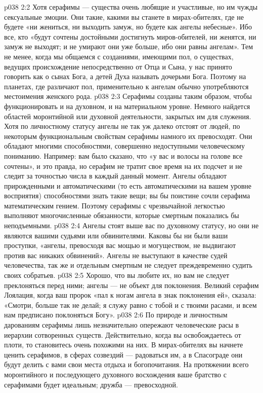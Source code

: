 \vs p038 2:2 \pc Хотя серафимы --- существа очень любящие и участливые, но им чужды сексуальные эмоции. Они такие, какими вы станете в мирах\hyp{}обителях, где не будете «ни жениться, ни выходить замуж, но будете как ангелы небесные». Ибо все, кто «будут сочтены достойными достигнуть миров\hyp{}обителей, ни женятся, ни замуж не выходят; и не умирают они уже больше, ибо они равны ангелам». Тем не менее, когда мы общаемся с созданиями, имеющими пол, о существах, ведущих происхождение непосредственно от Отца и Сына, у нас принято говорить как о сынах Бога, а детей Духа называть дочерьми Бога. Поэтому на планетах, где различают пол, применительно к ангелам обычно употребляются местоимения женского рода.
\vs p038 2:3 Серафимы созданы таким образом, чтобы функционировать и на духовном, и на материальном уровне. Немного найдется областей моронтийной или духовной деятельности, закрытых им для служения. Хотя по личностному статусу ангелы не так уж далеко отстоят от людей, по некоторым функциональным свойствам серафимы намного их превосходят. Они обладают многими способностями, совершенно недоступными человеческому пониманию. Например: вам было сказано, что «у вас и волосы на голове все сочтены», и это правда, но серафим не тратит свое время на их подсчет и не следит за точностью числа в каждый данный момент. Ангелы обладают прирожденными и автоматическими (то есть автоматическими на вашем уровне восприятия) способностями знать такие вещи; вы бы поистине сочли серафима математическим гением. Поэтому серафимы с чрезвычайной легкостью выполняют многочисленные обязанности, которые смертным показались бы неподъемными.
\vs p038 2:4 \pc Ангелы стоят выше вас по духовному статусу, но они не являются вашими судьями или обвинителями. Каковы бы ни были ваши проступки, «ангелы, превосходя вас мощью и могуществом, не выдвигают против вас никаких обвинений». Ангелы не выступают в качестве судей человечества, так же и отдельным смертным не следует преждевременно судить своих собратьев.
\vs p038 2:5 \pc Хорошо, что вы любите их, но вам не следует преклоняться перед ними; ангелы --- не объект для поклонения. Великий серафим Лоялация, когда ваш пророк «пал к ногам ангела в знак поклонения ей», сказала: «Смотри, больше так не делай; я служу равно с тобой и с твоими расами, и всем нам предписано поклоняться Богу».
\vs p038 2:6 По природе и личностным дарованиям серафимы лишь незначительно опережают человеческие расы в иерархии сотворенных существ. Действительно, когда вы освобождаетесь от плоти, то становитесь очень похожими на них. В мирах\hyp{}обителях вы начнете ценить серафимов, в сферах созвездий --- радоваться им, а в Спасограде они будут делить с вами свои места отдыха и богопочитания. На протяжении всего моронтийного и последующего духовного восхождения ваше братство с серафимами будет идеальным; дружба --- превосходной.
